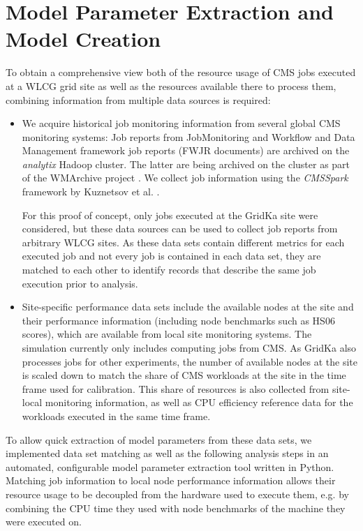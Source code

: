 \documentclass[a4paper]{jpconf}
\begin{document}
\section{Model Parameter Extraction and Model Creation}
\label{sec:param}

To obtain a comprehensive view both of the resource usage of CMS jobs executed at a WLCG grid site as well as the resources available there to process them, combining information from multiple data sources is required:
\begin{itemize}
    \item We acquire historical job monitoring information from several global CMS monitoring systems: Job reports from JobMonitoring and Workflow and Data Management framework job reports (FWJR documents) are archived on the \emph{analytix} Hadoop cluster.
    The latter are being archived on the cluster as part of the WMArchive project \cite{WMArchiveWorkloadArchive2018}.
    We collect job information using the \emph{CMSSpark} framework by Kuznetsov et al. \cite{cmsspark}.

    For this proof of concept, only jobs executed at the GridKa site were considered, but these data sources can be used to collect job reports from arbitrary WLCG sites.
    As these data sets contain different metrics for each executed job and not every job is contained in each data set, they are matched to each other to identify records that describe the same job execution prior to analysis.
    \item Site-specific performance data sets include the available nodes at the site and their performance information (including node benchmarks such as HS06 scores), which are available from local site monitoring systems.
    The simulation currently only includes computing jobs from CMS.
    As GridKa also processes jobs for other experiments, the number of available nodes at the site is scaled down to match the share of CMS workloads at the site in the time frame used for calibration.
    This share of resources is also collected from site-local monitoring information, as well as CPU efficiency reference data for the workloads executed in the same time frame.
\end{itemize}
To allow quick extraction of model parameters from these data sets, we implemented data set matching as well as the following analysis steps in an automated, configurable model parameter extraction tool written in Python.
Matching job information to local node performance information allows their resource usage to be decoupled from the hardware used to execute them, e.g. by combining the CPU time they used with node benchmarks of the machine they were executed on.
\end{document}
